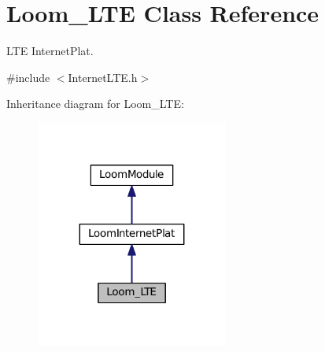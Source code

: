 \hypertarget{class_loom___l_t_e}{}\section{Loom\+\_\+\+L\+TE Class Reference}
\label{class_loom___l_t_e}


L\+TE Internet\+Plat.  




{\ttfamily \#include $<$Internet\+L\+T\+E.\+h$>$}



Inheritance diagram for Loom\+\_\+\+L\+TE\+:\nopagebreak
\begin{figure}[H]
\begin{center}
\leavevmode
\includegraphics[width=179pt]{class_loom___l_t_e__inherit__graph}
\end{center}
\end{figure}
